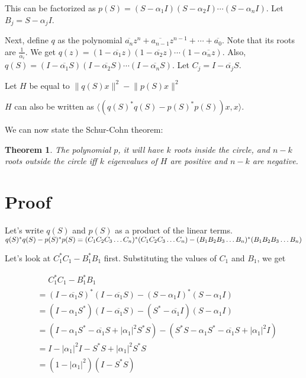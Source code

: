 \documentclass[twofold, twocolumn]{article}
\newcommand*\conj[1]{\overline{#1}}
\newcommand*\adj[1]{#1^*}
\newcommand*\abs[1]{\left \vert #1 \right\vert}
\theoremstyle{plain}
\newtheorem*{theorem}{Theorem}
\theoremstyle{definition}
\begin{document}
This can be factorized as \(p(S) = (S - \alpha_1I) (S - \alpha_2 I) \cdots (S - \alpha_n I)\). Let \(B_j = S - \alpha_jI\).

Next, define \(q\) as the polynomial \(\conj{a_n}z^n + \conj{a_{n-1}}z^{n-1} + \cdots + \conj{a_0}\). Note that its roots are \(\frac {1}{\conj{\alpha_i}}\). We get \(q(z) = (1 - \conj{\alpha_1}z) (1 - \conj{\alpha_2}z) \cdots (1 - \conj{\alpha_nz})\). Also, \(q(S) = (I - \conj{\alpha_1}S) (I - \conj{\alpha_2}S) \cdots (I - \conj{\alpha_n}S)\). Let \(C_j= I -  \conj{\alpha_j} S\).


Let \(H\) be equal to \(\lVert q(S) x \rVert^2 - \lVert p(S) x \rVert^2\)

\(H\) can also be written as \(\langle (\adj{q(S)} q(S) - \adj{p(S)} p(S))x, x\rangle\).

We can now state the Schur-Cohn theorem:

\begin{theorem}The polynomial \(p\), it will have \(k\) roots inside the circle, and \(n-k\) roots outside the circle iff \(k\) eigenvalues of \(H\) are positive and \(n-k\) are negative. \end{theorem}

\section{Proof}

Let's write \(q(S)\) and \(p(S)\) as a product of the linear terms. \(\adj{q(S)} q(S) - \adj{p(S)} p(S) \\= \adj{(C_1C_2C_3 \ldots C_n)}(C_1C_2C_3\ldots C_n) - \adj{(B_1B_2B_3\ldots B_n)} (B_1B_2B_3\ldots B_n)\)

Let's look at \(\adj{C_1} C_1 - \adj{B_1} B_1\) first. Substituting the values of \(C_1\) and \(B_1\), we get 

\begin{equation*}
\begin{split}
& \phantom{=}    \adj{C_1}C_1 - \adj{B_1} B_1 \\
 & = \adj{(I - \conj{\alpha_1}S)} (I - \conj{\alpha_1}S) - \adj{(S - \alpha_1 I)} (S - \alpha_1 I) \\
& = (I - \alpha_1\adj{S}) (I - \conj{\alpha_1}S) - (\adj{S} - \conj{\alpha_1} I) (S - \alpha_1 I) \\
 & = (I - \alpha_1\adj{S} - \conj{\alpha_1}S + \abs{\alpha_1}^2 \adj{S} S) - (\adj{S} S - \alpha_1 \adj{S} - \conj{\alpha_1} S + \abs{\alpha_1}^2I)\\
& = I - \abs{\alpha_1}^2 I - \adj{S} S + \abs{\alpha_1}^2 \adj{S} S \\
& = (1 - \abs{\alpha_1}^2) (I - \adj{S} S)
\end{split}
\end{equation*}
\end{document}
